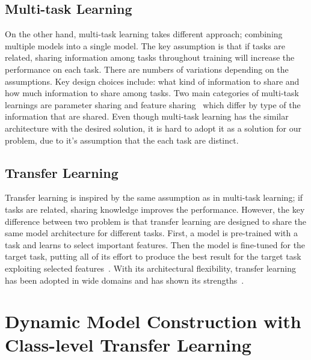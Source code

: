 \documentclass{article}
\begin{document}
\subsection{Multi-task Learning}
On the other hand, multi-task learning takes different approach; combining multiple models into a single model. The key assumption is that if tasks are related, sharing information among tasks throughout training will increase the performance on each task. There are numbers of variations depending on the assumptions. Key design choices include: what kind of information to share and how much information to share among tasks. Two main categories of multi-task learnings are parameter sharing and feature sharing~\cite{ruder2017overview, Caruana1993MultitaskLA, duong2015low, lu2017fully} which differ by type of the information that are shared. Even though multi-task learning has the similar architecture with the desired solution, it is hard to adopt it as a solution for our problem, due to it's assumption that the each task are distinct.

\subsection{Transfer Learning}

Transfer learning is inspired by the same assumption as in multi-task learning; if tasks are related, sharing knowledge improves the performance. However, the key difference between two problem is that transfer learning are designed to share the same model architecture for different tasks. First, a model is pre-trained with a task and learns to select important features. Then the model is fine-tuned for the target task, putting all of its effort to produce the best result for the target task exploiting selected features~\cite{yosinski2014transferable}. With its architectural flexibility, transfer learning has been adopted in wide domains and has shown its strengths~\cite{raina2007self, egan2004effects, glorot2011domain}.

\section{Dynamic Model Construction with Class-level Transfer Learning}
\end{document}
